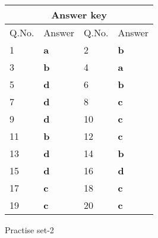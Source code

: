 \setlength\arrayrulewidth{1pt}
\begin{table}[H]
	\centering
	\begin{tabular}{|p{1.5cm}|p{1.5cm}||p{1.5cm}|p{1.5cm}|}
		\hline
		\multicolumn{4}{|c|}{\textbf{Answer key}}\\\hline\hline
		\rowcolor{ocrel}Q.No.&Answer&Q.No.&Answer\\\hline
		1&\textbf{a} &2&\textbf{b}\\\hline 
		3&\textbf{b} &4&\textbf{a} \\\hline
		5&\textbf{d} &6&\textbf{b} \\\hline
		7&\textbf{d}&8&\textbf{c}\\\hline
		9&\textbf{d}&10&\textbf{c}\\\hline
		11&\textbf{b} &12&\textbf{c}\\\hline
		13&\textbf{d}&14&\textbf{b}\\\hline
		15&\textbf{d}&16&\textbf{d}\\\hline
		17&\textbf{c} &18&\textbf{c}\\\hline
		19&\textbf{c}&20&\textbf{c}\\\hline
	\end{tabular}
\end{table}
\newpage
\begin{abox}
	Practise set-2
\end{abox}
